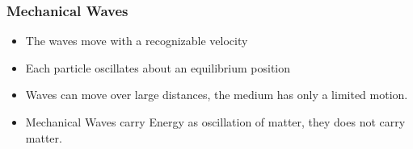 \documentclass[]{beamer}
\begin{document}
\begin{frame}
  \frametitle{Mechanical Waves}
  

  
  \begin{itemize}
    \item \textcolor{mypink1}{The waves move with a recognizable velocity} \pause
    \item \textcolor{mypink1}{Each particle oscillates about an equilibrium position}\pause
    \item \textcolor{mypink1}{Waves can move over large distances,  the medium   has only a limited motion. }\pause
    \item \textcolor{mypink1}{Mechanical Waves carry  Energy as oscillation of matter, they does not carry matter.}
  \end{itemize}
  
  
 
  
  
  
  
    \end{frame}
\end{document}
